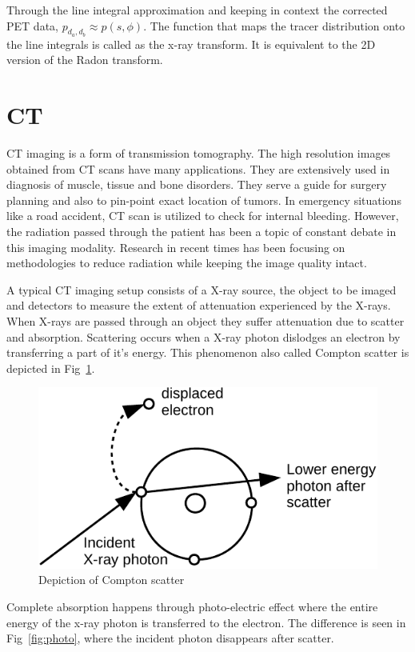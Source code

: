 Through the line integral approximation and keeping in context the corrected \ac{PET} data, $p_{d_{a},d_{b}}\approx p(s,\phi)$. The function that maps the tracer distribution onto the line integrals is called as the x-ray transform. It is equivalent to the 2D version of the Radon transform. 

\section{CT}

\ac{CT} imaging is a form of transmission tomography. The high resolution images obtained from \ac{CT} scans have many applications. They are extensively used in diagnosis of muscle, tissue and bone disorders. They serve a guide for surgery planning and also to pin-point exact location of tumors. In emergency situations like a road accident, \ac{CT} scan is utilized to check for internal bleeding. However, the radiation passed through the patient has been a topic of constant debate in this imaging modality. Research in recent times has been focusing on methodologies to reduce radiation while keeping the image quality intact. 


A typical \ac{CT} imaging setup consists of a X-ray source, the object to be imaged and detectors to measure the extent of attenuation experienced by the X-rays. When X-rays are passed through an object they suffer attenuation due to scatter and absorption. Scattering occurs when a X-ray photon dislodges an electron by transferring a part of it's energy. This phenomenon also called Compton scatter is depicted in Fig~\ref{fig:com}. 
\begin{figure}[!htbp]
	\centering
	\includegraphics[width=0.7\linewidth]{./Figures/compton-crop.pdf}
	\caption{Depiction of Compton scatter}
	\label{fig:com}
\end{figure}

Complete absorption happens through photo-electric effect where the entire energy of the x-ray photon is transferred to the electron. The difference is seen in Fig~\ref{fig:photo}, where the incident photon disappears after scatter. 

